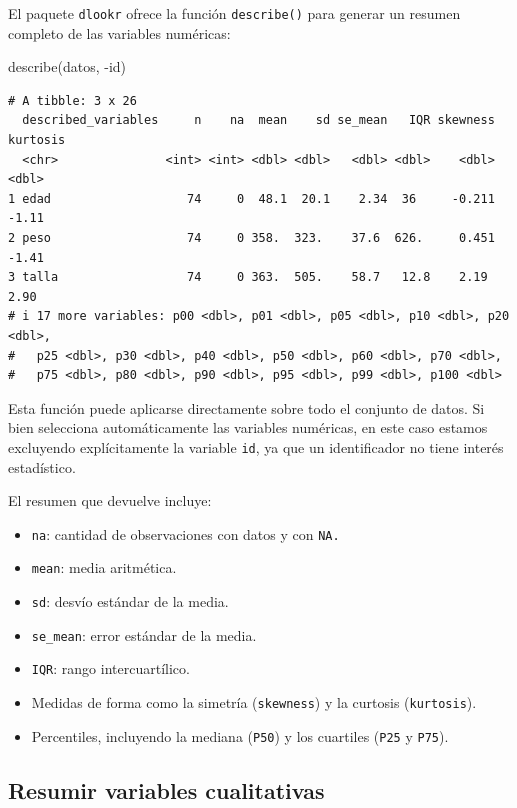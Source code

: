 \documentclass[
  spanish,
  letterpaper,
  DIV=11,
  numbers=noendperiod]{scrreprt}
\newenvironment{Shaded}{\begin{snugshade}}{\end{snugshade}}
\newcommand{\FunctionTok}[1]{\textcolor[rgb]{0.28,0.35,0.67}{#1}}
\newcommand{\NormalTok}[1]{\textcolor[rgb]{0.00,0.23,0.31}{#1}}
\newcommand{\SpecialCharTok}[1]{\textcolor[rgb]{0.37,0.37,0.37}{#1}}
\begin{document}
El paquete \texttt{dlookr} ofrece la función \texttt{describe()} para
generar un resumen completo de las variables numéricas:

\begin{Shaded}
\begin{Highlighting}[]
\FunctionTok{describe}\NormalTok{(datos, }\SpecialCharTok{{-}}\NormalTok{id)}
\end{Highlighting}
\end{Shaded}

\begin{verbatim}
# A tibble: 3 x 26
  described_variables     n    na  mean    sd se_mean   IQR skewness kurtosis
  <chr>               <int> <int> <dbl> <dbl>   <dbl> <dbl>    <dbl>    <dbl>
1 edad                   74     0  48.1  20.1    2.34  36     -0.211    -1.11
2 peso                   74     0 358.  323.    37.6  626.     0.451    -1.41
3 talla                  74     0 363.  505.    58.7   12.8    2.19      2.90
# i 17 more variables: p00 <dbl>, p01 <dbl>, p05 <dbl>, p10 <dbl>, p20 <dbl>,
#   p25 <dbl>, p30 <dbl>, p40 <dbl>, p50 <dbl>, p60 <dbl>, p70 <dbl>,
#   p75 <dbl>, p80 <dbl>, p90 <dbl>, p95 <dbl>, p99 <dbl>, p100 <dbl>
\end{verbatim}

Esta función puede aplicarse directamente sobre todo el conjunto de
datos. Si bien selecciona automáticamente las variables numéricas, en
este caso estamos excluyendo explícitamente la variable \texttt{id}, ya
que un identificador no tiene interés estadístico.

El resumen que devuelve incluye:

\begin{itemize}
\item
  \texttt{na}: cantidad de observaciones con datos y con \texttt{NA.}
\item
  \texttt{mean}: media aritmética.
\item
  \texttt{sd}: desvío estándar de la media.
\item
  \texttt{se\_mean}: error estándar de la media.
\item
  \texttt{IQR}: rango intercuartílico.
\item
  Medidas de forma como la simetría (\texttt{skewness}) y la curtosis
  (\texttt{kurtosis}).
\item
  Percentiles, incluyendo la mediana (\texttt{P50}) y los cuartiles
  (\texttt{P25} y \texttt{P75}).
\end{itemize}

\subsection{Resumir variables
cualitativas}\label{resumir-variables-cualitativas}
\end{document}
